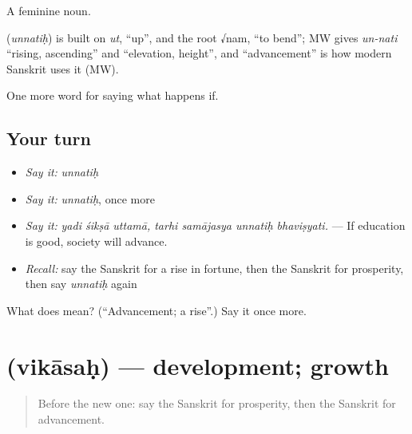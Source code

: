 A feminine noun.

\begin{cousinweb}
\textbf{} (\emph{unnatiḥ}) is built on \emph{ut}, \textquotedblleft{}up\textquotedblright{}, and the root √nam, \textquotedblleft{}to bend\textquotedblright{}; MW gives \emph{un-nati} \textquotedblleft{}rising, ascending\textquotedblright{} and \textquotedblleft{}elevation, height\textquotedblright{}, and \textquotedblleft{}advancement\textquotedblright{} is how modern Sanskrit uses it (MW).
\end{cousinweb}

\begin{grammarlens}[title={What you've built}]
One more word for saying what happens if.
\end{grammarlens}

\subsection*{Your turn}
\begin{itemize}
\raggedright
  \item \emph{Say it:} \emph{unnatiḥ}
  \item \emph{Say it:} \emph{unnatiḥ}, once more
  \item \emph{Say it:} \emph{yadi śikṣā uttamā, tarhi samājasya unnatiḥ bhaviṣyati.} — If education is good, society will advance.
  \item \emph{Recall:} say the Sanskrit for a rise in fortune, then the Sanskrit for prosperity, then say \emph{unnatiḥ} again
\end{itemize}

\begin{tcolorbox}[breakable,colback=teal!4,colframe=teal!35!black,title={Before you move on}]
What does  mean? (\textquotedblleft{}Advancement; a rise\textquotedblright{}.) Say it once more.
\end{tcolorbox}
\section[\texorpdfstring{\sk{विकासः} (vikāsaḥ)}{विकासः (vikāsaḥ)}]{ (vikāsaḥ) — development; growth}

\label{lesson:SA-C387-vikasah}



\begin{quote}
Before the new one: say the Sanskrit for prosperity, then the Sanskrit for advancement.
\end{quote}

